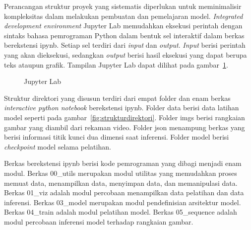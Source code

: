 Perancangan struktur proyek yang sistematis diperlukan untuk meminimalisir kompleksitas dalam
melakukan pembuatan dan pemelajaran model. \textit{Integrated development environment} Jupyter Lab
memudahkan eksekusi perintah dengan sintaks bahasa pemrograman Python dalam bentuk sel interaktif
dalam berkas berekstensi ipynb. Setiap sel terdiri dari
\textit{input} dan \textit{output}. \textit{Input} berisi perintah yang akan dieksekusi, sedangkan
\textit{output} berisi hasil eksekusi yang dapat berupa teks ataupun grafik. Tampilan Jupyter Lab
dapat dilihat pada gambar~\ref{fig:jupyterlab}.

\begin{figure}[htbp]
    \begin{center}
    \end{center}
    \vspace{-20pt}
    \captionsetup{labelfont=bf, textfont=bf}
    \caption{Jupyter Lab}
    \vspace{-10pt}
    \captionsetup{labelfont=md, textfont=md}
    \label{fig:jupyterlab}
\end{figure}


Struktur direktori yang disusun terdiri dari empat folder dan enam berkas \textit{interactive python notebook}
berekstensi ipynb. Folder data berisi data latihan model seperti pada gambar~\ref{fig:strukturdirektori}.
Folder imgs berisi rangkaian gambar yang
diambil dari rekaman video. Folder json menampung berkas yang berisi informasi titik kunci dua dimensi saat
inferensi. Folder model berisi \textit{checkpoint} model selama pelatihan.

Berkas berekstensi ipynb berisi kode pemrograman yang dibagi menjadi enam modul.
Berkas 00\_utils merupakan modul utilitas yang memudahkan proses memuat data, menampilkan data, menyimpan data, dan memanipulasi data.
Berkas 01\_viz adalah modul percobaan menampilkan data pelatihan dan data inferensi.
Berkas 03\_model merupakan modul pendefinisian arsitektur model.
Berkas 04\_train adalah modul pelatihan model.
Berkas 05\_sequence adalah modul percobaan inferensi model terhadap rangkaian gambar.

